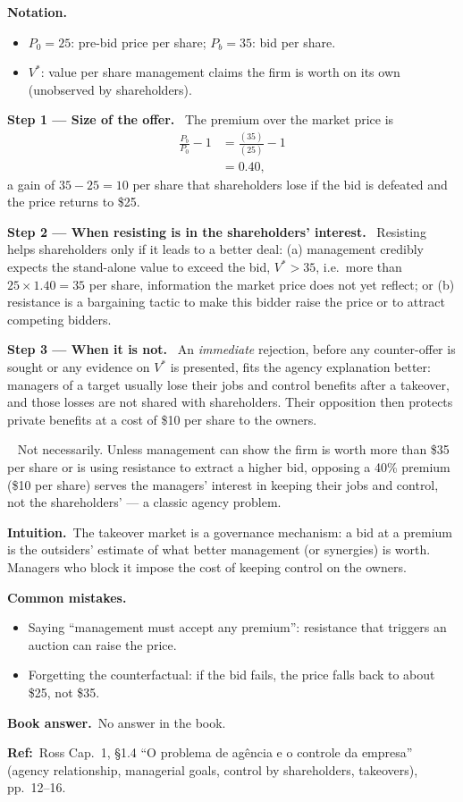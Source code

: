 \documentclass[11pt,a4paper]{article}
\newcommand{\notation}{\par\noindent\textbf{Notation.}}
\newcommand{\step}[2]{\par\medskip\noindent\textbf{Step #1 --- #2.}~}
\newcommand{\intuition}{\par\medskip\noindent\textbf{Intuition.}~}
\newcommand{\bookans}{\par\medskip\noindent\textbf{Book answer.}~}
\newcommand{\refbib}{\par\smallskip\noindent\textbf{Ref:}~}
\newcommand{\answer}[1]{\par\smallskip\noindent\fbox{\textbf{Answer #1.}}~}
\newcommand{\pitfalls}{\par\medskip\noindent\textbf{Common mistakes.}}
\begin{document}
\notation
\begin{itemize}
  \item $P_0=25$: pre-bid price per share; $P_b=35$: bid per share.
  \item $V^*$: value per share management claims the firm is worth on its own (unobserved by shareholders).
\end{itemize}

\step{1}{Size of the offer} The premium over the market price is
\begin{align}
  \frac{P_b}{P_0}-1 &= \frac{(35)}{(25)}-1 \label{r8e1-prem}\\
                    &= 0.40, \nonumber
\end{align}
a gain of $35-25=10$ per share that shareholders lose if the bid is defeated and the price returns to \$25.

\step{2}{When resisting is in the shareholders' interest} Resisting helps shareholders only if it leads to a better deal: (a) management credibly expects the stand-alone value to exceed the bid, $V^*>35$, i.e.\ more than $25\times1.40=35$ per share, information the market price does not yet reflect; or (b) resistance is a bargaining tactic to make this bidder raise the price or to attract competing bidders.

\step{3}{When it is not} An \emph{immediate} rejection, before any counter-offer is sought or any evidence on $V^*$ is presented, fits the agency explanation better: managers of a target usually lose their jobs and control benefits after a takeover, and those losses are not shared with shareholders. Their opposition then protects private benefits at a cost of \$10 per share to the owners.

\answer{} Not necessarily. Unless management can show the firm is worth more than \$35 per share or is using resistance to extract a higher bid, opposing a 40\% premium (\$10 per share) serves the managers' interest in keeping their jobs and control, not the shareholders' --- a classic agency problem.

\intuition The takeover market is a governance mechanism: a bid at a premium is the outsiders' estimate of what better management (or synergies) is worth. Managers who block it impose the cost of keeping control on the owners.

\pitfalls
\begin{itemize}
  \item Saying ``management must accept any premium'': resistance that triggers an auction can raise the price.
  \item Forgetting the counterfactual: if the bid fails, the price falls back to about \$25, not \$35.
\end{itemize}
\bookans No answer in the book.
\refbib{Ross Cap.~1, \S1.4 ``O problema de ag\^encia e o controle da empresa'' (agency relationship, managerial goals, control by shareholders, takeovers), pp.~12--16.}
\end{document}
